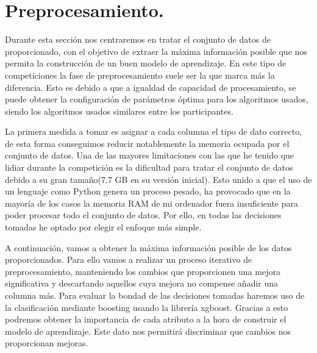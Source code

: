 \chapter{Preprocesamiento.}
Durante esta sección nos centraremos en tratar el conjunto de datos de proporcionado, con el objetivo de extraer la máxima información posible que nos permita la construcción de un buen modelo de aprendizaje.
En este tipo de competiciones la fase de preprocesamiento suele ser la que marca más la diferencia. Esto es debido a que a igualdad de capacidad de procesamiento, se puede obtener la configuración de parámetros óptima para los algoritmos usados, siendo los algoritmos usados similares entre los participantes.
\bigskip

La primera medida a tomar es asignar a cada columna el tipo de dato correcto, de esta forma conseguimos reducir notablemente la memoria ocupada por el conjunto de datos. 
Una de las mayores limitaciones con las que he tenido que lidiar durante la competición es la dificultad para tratar el conjunto de datos debido a su gran tamaño(7.7 GB en su versión inicial). Esto unido a que el uso de un lenguaje como Python genera un proceso pesado, ha provocado que en la mayoría de los casos la memoria RAM de mi ordenador fuera insuficiente para poder procesar todo el conjunto de datos. Por ello, en todas las decisiones tomadas he optado por elegir el enfoque más simple.
\medskip

A continuación, vamos a obtener la máxima información posible de los datos proporcionados. Para ello vamos a realizar un proceso iterativo de preprocesamiento, manteniendo los cambios que proporcionen una mejora significativa y descartando aquellos cuya mejora no compense añadir una columna más. Para evaluar la bondad de las decisiones tomadas haremos uso de la clasificación mediante boosting usando la librería xgboost. Gracias a esto podremos obtener la importancia de cada atributo a la hora de construir el modelo de aprendizaje. Este dato nos permitirá discriminar que cambios nos proporcionan mejoras.
\bigskip


